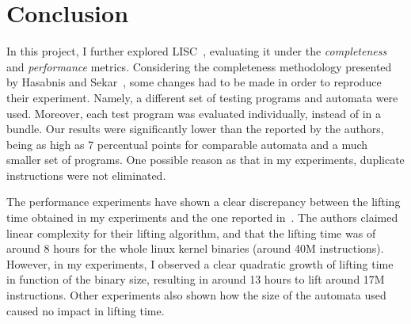 \documentclass[12pt]{article}
\begin{document}
\section{Conclusion} \label{sec:conc}

In this project, I further explored LISC~\cite{Hasabnis2014,LISC}, evaluating it under the \textit{completeness} and \textit{performance} metrics. Considering the completeness methodology presented by Hasabnis and Sekar~\cite{Hasabnis2014}, some changes had to be made in order to reproduce their experiment. Namely, a different set of testing programs and automata were used. Moreover, each test program was evaluated individually, instead of in a bundle. Our results were significantly lower than the reported by the authors, being as high as 7 percentual points for comparable automata and a much smaller set of programs. One possible reason as that in my experiments, duplicate instructions were not eliminated.

The performance experiments have shown a clear discrepancy between the lifting time obtained in my experiments and the one reported in~\cite{Hasabnis2014}. The authors claimed linear complexity for their lifting algorithm, and that the lifting time was of around 8 hours for the whole linux kernel binaries (around 40M instructions). However, in my experiments, I observed a clear quadratic growth of lifting time in function of the binary size, resulting in around 13 hours to lift around 17M instructions. Other experiments also shown how the size of the automata used caused no impact in lifting time.



\end{document}
